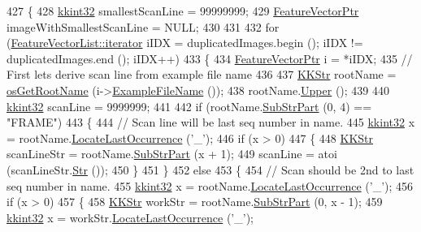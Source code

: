\begin{DoxyCode}
427 \{
428   \hyperlink{namespace_k_k_b_a8fa4952cc84fda1de4bec1fbdd8d5b1b}{kkint32}  smallestScanLine = 99999999;
429   \hyperlink{class_k_k_m_l_l_1_1_feature_vector}{FeatureVectorPtr}  imageWithSmallestScanLine = NULL;
430 
431 
432   \textcolor{keywordflow}{for}  (\hyperlink{class_k_k_b_1_1_k_k_queue_aa3c2796a726eea468b94132a9fbf2cfe}{FeatureVectorList::iterator}  iIDX = duplicatedImages.begin ();  iIDX != 
      duplicatedImages.end (); iIDX++)
433   \{
434     \hyperlink{class_k_k_m_l_l_1_1_feature_vector}{FeatureVectorPtr} i = *iIDX;
435     \textcolor{comment}{// First lets derive scan line from example file name}
436    
437     \hyperlink{class_k_k_b_1_1_k_k_str}{KKStr}  rootName = \hyperlink{namespace_k_k_b_af5b668ed9902d7f93b62529664a739f0}{osGetRootName} (i->\hyperlink{class_k_k_m_l_l_1_1_feature_vector_ab47c89ab1e9396664fdc0dc34b6e1ab5}{ExampleFileName} ());
438     rootName.\hyperlink{class_k_k_b_1_1_k_k_str_a66ea0feabc94da88591b56a683695bd9}{Upper} ();
439 
440     \hyperlink{namespace_k_k_b_a8fa4952cc84fda1de4bec1fbdd8d5b1b}{kkint32}  scanLine = 9999999;
441 
442     \textcolor{keywordflow}{if}  (rootName.\hyperlink{class_k_k_b_1_1_k_k_str_a5f20b2ddfc9f07c8ef99592810332ddb}{SubStrPart} (0, 4) == \textcolor{stringliteral}{"FRAME"})
443     \{
444       \textcolor{comment}{// Scan line will be last seq number in name.}
445       \hyperlink{namespace_k_k_b_a8fa4952cc84fda1de4bec1fbdd8d5b1b}{kkint32} x = rootName.\hyperlink{class_k_k_b_1_1_k_k_str_a595b364acd17c015b5f66d9f7996bfab}{LocateLastOccurrence} (\textcolor{charliteral}{'\_'});
446       \textcolor{keywordflow}{if}  (x > 0)
447       \{
448         \hyperlink{class_k_k_b_1_1_k_k_str}{KKStr}  scanLineStr = rootName.\hyperlink{class_k_k_b_1_1_k_k_str_a5f20b2ddfc9f07c8ef99592810332ddb}{SubStrPart} (x + 1);
449         scanLine = atoi (scanLineStr.\hyperlink{class_k_k_b_1_1_k_k_str_ad574e6c0fe7f6ce1ba3ab0a8ce2fbd52}{Str} ());
450       \}
451     \}
452     \textcolor{keywordflow}{else}
453     \{
454       \textcolor{comment}{// Scan should be 2nd to last seq number in name.}
455       \hyperlink{namespace_k_k_b_a8fa4952cc84fda1de4bec1fbdd8d5b1b}{kkint32} x = rootName.\hyperlink{class_k_k_b_1_1_k_k_str_a595b364acd17c015b5f66d9f7996bfab}{LocateLastOccurrence} (\textcolor{charliteral}{'\_'});
456       \textcolor{keywordflow}{if}  (x > 0)
457       \{
458         \hyperlink{class_k_k_b_1_1_k_k_str}{KKStr}  workStr = rootName.\hyperlink{class_k_k_b_1_1_k_k_str_a5f20b2ddfc9f07c8ef99592810332ddb}{SubStrPart} (0, x - 1);
459         \hyperlink{namespace_k_k_b_a8fa4952cc84fda1de4bec1fbdd8d5b1b}{kkint32} x = workStr.\hyperlink{class_k_k_b_1_1_k_k_str_a595b364acd17c015b5f66d9f7996bfab}{LocateLastOccurrence} (\textcolor{charliteral}{'\_'});

\end{DoxyCode}
